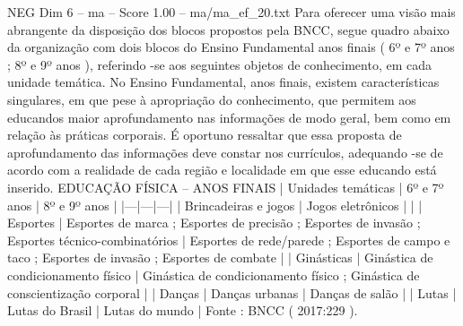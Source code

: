 \begin{textsample}{NEG Dim 6 – ma – Score 1.00 – ma/ma\_ef\_20.txt}
Para oferecer uma visão mais abrangente da disposição dos blocos propostos pela BNCC, segue quadro abaixo da organização com dois blocos do Ensino Fundamental anos finais ( 6º e 7º anos ; 8º e 9º anos ), referindo -se aos seguintes objetos de conhecimento, em cada unidade temática.
No Ensino Fundamental, anos finais, existem características singulares, em que pese à apropriação do conhecimento, que permitem aos educandos maior aprofundamento nas informações de modo geral, bem como em relação às práticas corporais.
É oportuno ressaltar que essa proposta de aprofundamento das informações deve constar nos currículos, adequando -se de acordo com a realidade de cada região e localidade em que esse educando está inserido.
EDUCAÇÃO FÍSICA – ANOS FINAIS | Unidades temáticas | 6º e 7º anos | 8º e 9º anos | |---|---|---| | Brincadeiras e jogos | Jogos eletrônicos | | | Esportes | Esportes de marca ; Esportes de precisão ; Esportes de invasão ; Esportes técnico-combinatórios | Esportes de rede/parede ; Esportes de campo e taco ; Esportes de invasão ; Esportes de combate | | Ginásticas | Ginástica de condicionamento físico | Ginástica de condicionamento físico ; Ginástica de conscientização corporal | | Danças | Danças urbanas | Danças de salão | | Lutas | Lutas do Brasil | Lutas do mundo | Fonte : BNCC ( 2017:229 ).

\end{textsample}
